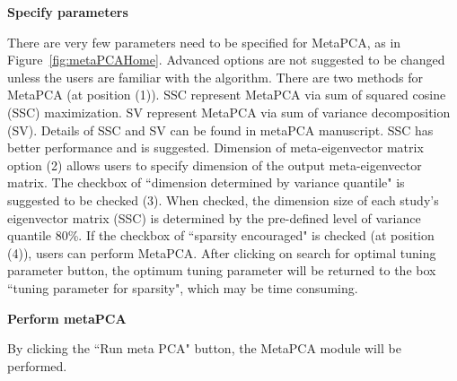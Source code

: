\begin{steps}

\item \textbf{Specify parameters} 

There are very few parameters need to be specified for MetaPCA, as in Figure~\ref{fig:metaPCAHome}.
Advanced options are not suggested to be changed unless the users are familiar with the algorithm.
There are two methods for MetaPCA (at position {\color{red} (1)}). 
SSC represent MetaPCA via sum of squared cosine (SSC) maximization.
SV represent MetaPCA via sum of variance decomposition (SV).
Details of SSC and SV can be found in metaPCA manuscript.
SSC has better performance and is suggested.
Dimension of meta-eigenvector matrix option {\color{red} (2)} allows users to specify dimension of the output meta-eigenvector matrix.
The checkbox of ``dimension determined by variance quantile" is suggested to be checked {\color{red} (3)}.
When checked, the dimension size of each study's eigenvector matrix (SSC) is determined  by the pre-defined level of variance quantile 80\%.
If the checkbox of ``sparsity encouraged" is checked (at position {\color{red} (4)}), users can perform MetaPCA.
After clicking on search for optimal tuning parameter button, the optimum tuning parameter will be returned to the box ``tuning parameter for sparsity", 
which may be time consuming.

\item \textbf{Perform metaPCA} 

By clicking the ``Run meta PCA" button, the MetaPCA module will be performed.


\end{steps}

